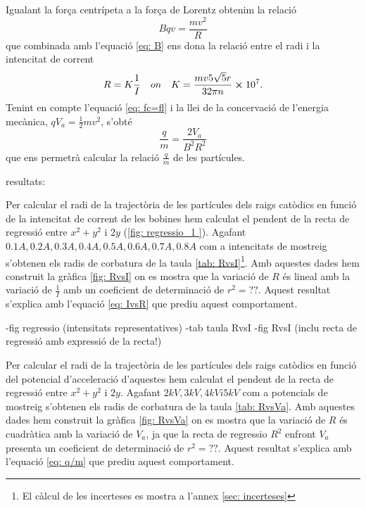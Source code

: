 \documentclass[11pt]{article}
\begin{document}
Igualant la força centrípeta a la força de Lorentz obtenim la relació 
\begin{equation}
    Bqv=\frac{mv^2}{R}
    \label{eq: fc=fl}
\end{equation}
que combinada amb l'equació \ref{eq: B} ens dona la relació entre el radi i la intencitat de corrent
\begin{equation}
    R=K\frac{1}{I} \quad on \quad K=\frac{mv5\sqrt{5}r}{32\pi n}\cross 10^7.
    \label{eq: IvsR}
\end{equation}
Tenint en compte l'equació \ref{eq: fc=fl} i la llei de la concervació de l'energia mecànica, $qV_a = \frac{1}{2}mv^2$, s'obté 
\begin{equation}
    \frac{q}{m}=\frac{2V_a }{B^2R^2}
    \label{eq: q/m}
\end{equation}
que ens permetrà calcular la relació $\frac{q}{m}$ de les partícules.

resultats:

Per calcular el radi de la trajectòria de les partícules dels raigs catòdics en funció de la intencitat de corrent de les bobines hem calculat el pendent de la recta de regressió entre $x^2+y^2$ i $2y$ (\ref{fig: regressio_1 }). Agafant $0.1A, 0.2A, 0.3A, 0.4A, 0.5A, 0.6A, 0.7A, 0.8A$ com a intencitats de mostreig s'obtenen els radis de corbatura de la taula \ref{tab: RvsI}\footnote{El càlcul de les incerteses es mostra a l'annex \ref{sec: incerteses}}. Amb aquestes dades hem construit la gràfica \ref{fig: RvsI} on es mostra que la variació de $R$ és lineal amb la variació de $\frac{1}{I}$ amb un coeficient de determinació de $r^2=??$. Aquest resultat s'explica amb l'equació \ref{eq: IvsR} que prediu aquest comportament.

-fig regressio (intensitats representatives)
-tab taula RvsI 
-fig RvsI (inclu recta de regressió amb expressió de la recta!)

Per calcular el radi de la trajectòria de les partícules dels raigs catòdics en funció del potencial d'acceleració d'aquestes hem calculat el pendent de la recta de regressió entre $x^2+y^2$ i $2y$. Agafant $2kV, 3kV, 4kV i 5kV$ com a potencials  de mostreig s'obtenen els radis de corbatura de la taula \ref{tab: RvsVa}. Amb aquestes dades hem construit la gràfica \ref{fig: RvsVa} on es mostra que la variació de $R$ és cuadràtica amb la variació de $V_a$, ja que la recta de regressio $R^2$ enfront $V_a$ presenta un coeficient de determinació de  $r^2=??$. Aquest resultat s'explica amb l'equació \ref{eq: q/m} que prediu aquest comportament.
\end{document}
